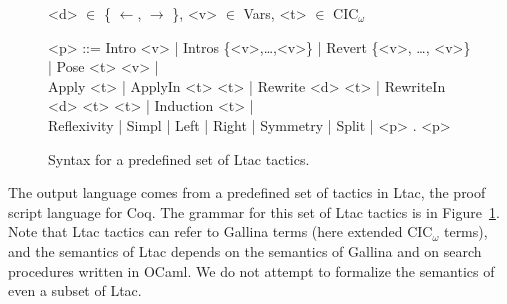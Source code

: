 \begin{figure}
\small
\begin{grammar}
<d> $\in$ \{ $\leftarrow$, $\rightarrow$ \}, <v> $\in$ Vars, <t> $\in$ CIC$_{\omega}$

<p> ::= Intro <v> | Intros \{<v>,\ldots,<v>\} | Revert \{<v>, \ldots, <v>\} | Pose <t> <v> | \\
Apply <t> | ApplyIn <t> <t> | Rewrite <d> <t> | RewriteIn <d> <t> <t> | Induction <t> |  \\
Reflexivity | Simpl | Left | Right | Symmetry | Split | <p> . <p>
\end{grammar}
\caption{Syntax for a predefined set of Ltac tactics.}
\label{fig:ltacsyntax}
\end{figure}

The output language comes from a predefined set of tactics in Ltac, the proof script language for Coq.
The grammar for this set of Ltac tactics is in Figure~\ref{fig:ltacsyntax}.
Note that Ltac tactics can refer to Gallina terms (here extended CIC$_{\omega}$ terms),
and the semantics of Ltac depends on the semantics of Gallina and on search procedures written in OCaml.
We do not attempt to formalize the semantics of even a subset of Ltac.

